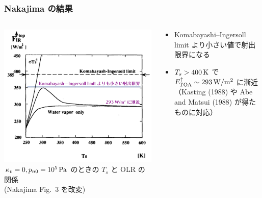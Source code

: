 \documentclass[aspectratio=149,9pt]{beamer}
\newcommand{\hmTOA}{\mathrm{TOA}}
\begin{document}
\begin{frame}
	\frametitle{Nakajima \etal の結果}
	\begin{columns}[c]
		\begin{column}{.6\textwidth}
			\centering\footnotesize
			\includegraphics[width=\textwidth]{nakajima3-cpp-crop.pdf}\\
			\(\kappa_v=0, p_{n0}=10^5\hmu{Pa}\) のときの \(T_s\) と OLR の関係\\
			(Nakajima \etal Fig.~3 を改変)
		\end{column}
		\begin{column}{.4\textwidth}
			\small
			\begin{itemize}
				\item Komabayashi--Ingersoll limit より小さい値で射出限界になる
				\item \(T_s>400\hmu{K}\) で \(F^\uparrow_\hmTOA\sim293\hmu{W/m^2}\) に漸近
					（Kasting (1988) や Abe and Matsui (1988)  が得たものに対応）
			\end{itemize}
		\end{column}
	\end{columns}
\end{frame}
\end{document}
